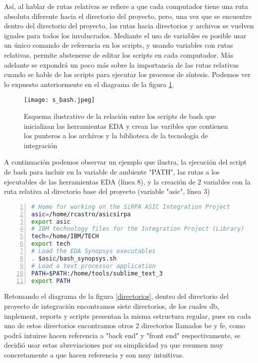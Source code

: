 Así, al hablar de rutas relativas se refiere a que cada computador tiene una ruta absoluta diferente hacia el directorio del proyecto, pero, una vez que se encuentre dentro del directorio del proyecto, las rutas hacia directorios y archivos se vuelven iguales para todos los involucrados. Mediante el uso de variables es posible usar un único comando de referencia en los scripts, y usando variables con rutas relativas, permite abstenerse de editar los scripts en cada computador. Más adelante se expondrá un poco más sobre la importancia de las rutas relativas cuando se hable de los scripts para ejecutar los procesos de síntesis. Podemos ver lo expuesto anteriormente en el diagrama de la figura \ref{bash_syn}.

\begin{figure}[h]
\texttt{[image: s\_bash.jpeg]}
\centering
\caption{Esquema ilustrativo de la relación entre los scripts de bash que inicializan las herramientas EDA y crean las varibles que contienen los punteros a los archivos y la biblioteca de la tecnología de integración}
\label{bash_syn}
\end{figure}

A continuación podemos observar un ejemplo que ilustra, la ejecución del script de bash para incluir en la variable de ambiente "PATH", las rutas a los ejecutables de las herramientas EDA (línea 8), y la creación de 2 variables con la ruta relativa al directorio base del proyecto (variable "asic", línea 3)



 \begin{lstlisting}[language=bash, numbers=left, keywordstyle=\color{blue}, commentstyle=\color{mygreen}]
# Home for working on the SiRPA ASIC Integration Project
asic=/home/rcastro/asicsirpa
export asic
# IBM technology files for the Integration Project (Library)
tech=/home/IBM/TECH
export tech
# Load the EDA Synopsys executables
. $asic/bash_synopsys.sh
# Load a text processor application
PATH=$PATH:/home/tools/sublime_text_3
export PATH
\end{lstlisting}


Retomando el diagrama de la figura \ref{directorios}, dentro del directorio del proyecto de integración encontramos siete directorios, de los cuales db, implement, reports y scripts presentan la misma estructura regular, pues en cada uno de estos directorios encontramos otros 2 directorios llamados be y fe, como podrá intuirse hacen referencia a "back end" y "front end" respectivamente, se decidió usar estas abreviaciones por su simplicidad ya que resumen muy concretamente a que hacen referencia y son muy intuitivas.

